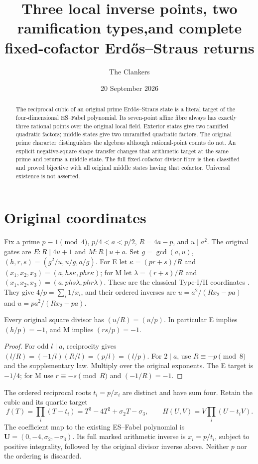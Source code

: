 \documentclass[11pt,reqno]{amsart}
\title[Prime-local Fabel fibres and fixed-cofactor returns]{Three local inverse points, two ramification types,\newline and complete fixed-cofactor Erd\H{o}s--Straus returns}
\author{The Clankers}\date{20 September 2026}
\begin{document}
\begin{abstract}
The reciprocal cubic of an original prime Erd\H{o}s--Straus state is a literal
target of the four-dimensional ES--Fabel polynomial. Its seven-point affine
fibre always has exactly three rational points over the original local field.
Exterior states give two ramified quadratic factors; middle states give two
unramified quadratic factors. The original prime character distinguishes the
algebras although rational-point counts do not. An explicit negative-square
shape transfer changes that arithmetic target at the same prime and returns a
middle state. The full fixed-cofactor divisor fibre is then classified and
proved bijective with all original middle states having that cofactor.
Universal existence is not asserted.
\end{abstract}
\maketitle

\section{Original coordinates}
Fix a prime $p\equiv1\pmod4$, $p/4<a<p/2$, $R=4a-p$, and $u\mid a^2$.
The original gates are $E:R\mid4u+1$ and $M:R\mid u+a$.
Set $g=\gcd(a,u)$, $(h,r,s)=(g^2/u,u/g,a/g)$. For E let
$\kappa=(pr+s)/R$ and $(x_1,x_2,x_3)=(a,hs\kappa,phr\kappa)$;
for M let $\lambda=(r+s)/R$ and $(x_1,x_2,x_3)=(a,phs\lambda,phr\lambda)$.
These are the classical Type-I/II coordinates \cite[\S2]{ET}.
They give $4/p=\sum_i1/x_i$, and their ordered inverses are
$u=a^2/(Rx_2-pa)$ and $u=pa^2/(Rx_2-pa)$.

\begin{lemma}
Every original square divisor has $(u/R)=(u/p)$. In particular E implies
$(h/p)=-1$, and M implies $(rs/p)=-1$.
\end{lemma}
\begin{proof}
For odd $l\mid a$, reciprocity gives $(l/R)=(-1/l)(R/l)=(p/l)=(l/p)$.
For $2\mid a$, use $R\equiv-p\pmod8$ and the supplementary law. Multiply over
the original exponents. The E target is $-1/4$; for M use
$r\equiv-s\pmod R$ and $(-1/R)=-1$.
\end{proof}

The ordered reciprocal roots $t_i=p/x_i$ are distinct and have sum four.
Retain the cubic and its quartic target
\[
 f(T)=\prod_i(T-t_i)=T^3-4T^2+\sigma_2T-\sigma_3,
 \qquad H(U,V)=V\prod_i(U-t_iV).
\]
The coefficient map to the existing ES--Fabel polynomial is
$\mathbf U=(0,-4,\sigma_2,-\sigma_3)$. Its full marked arithmetic inverse is
$x_i=p/t_i$, subject to positive integrality, followed by the original divisor
inverse above. Neither $p$ nor the ordering is discarded.
\end{document}
